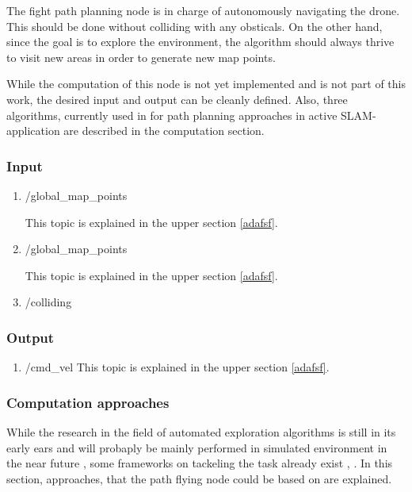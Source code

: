 	The fight path planning node is in charge of autonomously navigating the drone. This should be done without colliding with any obsticals. 
	On the other hand, since the goal is to explore the environment, the algorithm should always thrive to visit new areas in order to generate 
	new map points. 
	
	While the computation of this node is not yet implemented and is not part of this work, the desired input and output can be cleanly defined. 
	Also, three algorithms, currently used in for path planning approaches in active SLAM-application are described in the computation section. 
	
	\subsubsection{Input}
	
	\begin{enumerate}
	\item{/global\_map\_points}
	
	This topic is explained in the upper section \ref{adafsf}. 
	
	\item{/global\_map\_points}
	
	This topic is explained in the upper section \ref{adafsf}.
	
	\item{/colliding}
	
	
	\end{enumerate}
	
	\subsubsection{Output}
	
	\begin{enumerate}
	\item{/cmd\_vel}
	This topic is explained in the upper section \ref{adafsf}.
	\end{enumerate}
	
	\subsubsection{Computation approaches}
	
	While the research in the field of automated exploration algorithms is still in its early ears \cite{early} and will probaply be mainly performed 
	in simulated environment in the near future \cite{deep}, some frameworks on tackeling the 
	task already exist \cite{early}, \cite{deep} \cite{accurat} \cite{lopez}. 
	In this section, approaches, that the path flying node could be based on are explained. 
	
